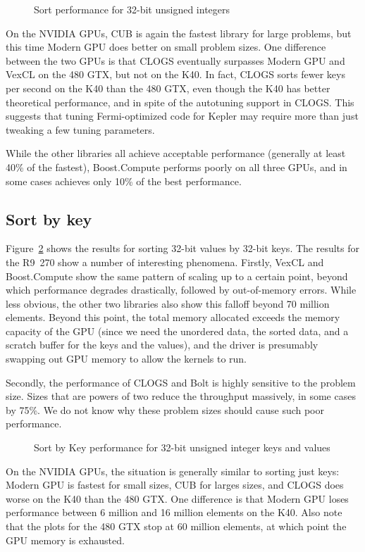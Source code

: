 \documentclass{ws-ppl}
\begin{document}
\begin{figure}[hb]
  
  \caption{Sort performance for 32-bit unsigned integers}\label{fig:sort}
\end{figure}

On the NVIDIA GPUs, CUB is again the fastest library for large problems, but
this time Modern GPU does better on small problem sizes. One difference between
the two GPUs is that CLOGS eventually surpasses Modern GPU and VexCL on the 480
GTX, but not on the K40. In fact, CLOGS sorts fewer keys per second on the K40
than the 480 GTX, even though the K40 has better theoretical performance, and
in spite of the autotuning support in CLOGS. This suggests that tuning
Fermi-optimized code for Kepler may require more than just tweaking a few
tuning parameters.

While the other libraries all achieve acceptable performance (generally at
least 40\% of the fastest), Boost.Compute performs poorly on all three GPUs,
and in some cases achieves only 10\% of the best performance.

\subsection{Sort by key}
Figure~\ref{fig:sort-by-key} shows the results for sorting 32-bit values by
32-bit keys. The results for the R9~270 show a number of interesting phenomena.
Firstly, VexCL and Boost.Compute show the same pattern of scaling up to a
certain point, beyond which performance degrades drastically, followed by
out-of-memory errors. While less obvious, the other two libraries also
show this falloff beyond 70 million elements. Beyond this point, the total
memory allocated exceeds the memory capacity of the GPU (since we need the
unordered data, the sorted data, and a scratch buffer for the keys and the
values), and the driver is presumably swapping out GPU memory to allow the
kernels to run.

Secondly, the performance of CLOGS and Bolt is highly sensitive to the problem
size. Sizes that are powers of two reduce the throughput massively, in some
cases by 75\%. We do not know why these problem sizes should cause such poor
performance.
\begin{figure}[hb]
  
  \caption{Sort by Key performance for 32-bit unsigned integer keys and values}\label{fig:sort-by-key}
\end{figure}

On the NVIDIA GPUs, the situation is generally similar to sorting just keys:
Modern GPU is fastest for small sizes, CUB for larges sizes, and CLOGS does worse
on the K40 than the 480 GTX. One difference is that Modern GPU loses performance
between 6 million and 16 million elements on the K40. Also note that the plots
for the 480 GTX stop at 60 million elements, at which point the GPU memory is
exhausted.
\end{document}
